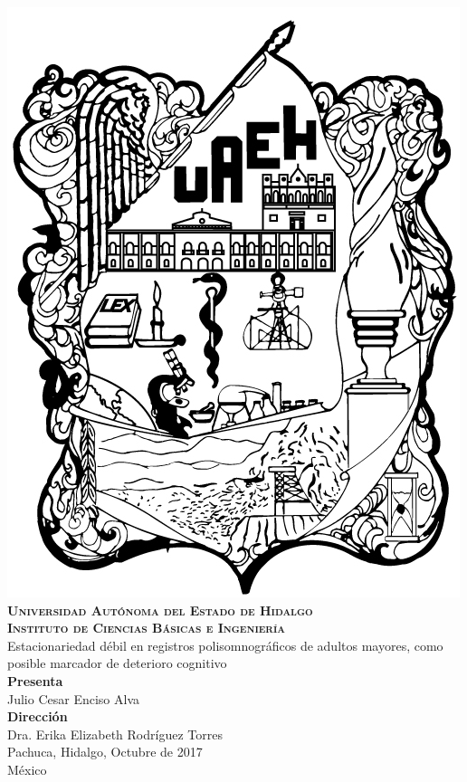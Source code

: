 \documentclass[12pt,letterpaper]{book}
\begin{document}
{%
\begin{center}
    \includegraphics[width=0.2\linewidth]{./img_oficiales/logo_uaeh.png}\\
    {\Large \textbf{ \textsc{
        Universidad Aut\'onoma del Estado de Hidalgo\\
        Instituto de Ciencias B\'asicas e Ingenier\'ia\\
        }}
    \vspace*{3em}
    }
    {\huge
        Estacionariedad d\'ebil en registros polisomnogr\'aficos de adultos mayores,
        como posible marcador de deterioro cognitivo\\
    \vspace*{2em}
    }
    {\large
        \textbf{Presenta}\\
        \vspace*{.25em}}
        {\Large
        Julio Cesar Enciso Alva\\
        \vspace*{3.5em}
        }
        {\large
        \textbf{Direcci\'on}\\
        \vspace*{.25em}}
        {\Large
        Dra. Erika Elizabeth Rodr\'iguez Torres\\
    \vspace*{3.5em}
    }
    {\large
    Pachuca, Hidalgo, Octubre de 2017\\
    M\'exico
    }
\end{center}
}

\newpage


\setcounter{page}{1}
\end{document}
